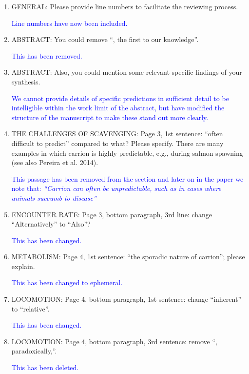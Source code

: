 \documentclass[12pt,letterpaper]{article}
\begin{document}
\begin{enumerate}

\item{GENERAL:} Please provide line numbers to facilitate the reviewing process.

\textcolor{blue}{Line numbers have now been included. }

\item{ABSTRACT:} You could remove ``, the first to our knowledge''.

\textcolor{blue}{This has been removed.}

\item{ABSTRACT:} Also, you could mention some relevant specific findings of your synthesis.

\textcolor{blue}{We cannot provide details of specific predictions in sufficient detail to be intelligible within the work limit of the abstract, but have modified the structure of the manuscript to make these stand out more clearly.} 


\item{THE CHALLENGES OF SCAVENGING:} Page 3, 1st sentence: ``often difficult to predict'' compared to what? Please specify. There are many examples in which carrion is highly predictable, e.g., during salmon spawning (see also Pereira et al. 2014).

\textcolor{blue}{This passage has been removed from the section and later on in the paper we note that: \textit{``Carrion can often be unpredictable, such as in cases where animals succumb to disease''}}

\item{ENCOUNTER RATE:} Page 3, bottom paragraph, 3rd line: change ``Alternatively'' to ``Also''?

\textcolor{blue}{This has been changed.}

\item{METABOLISM:} Page 4, 1st sentence: ``the sporadic nature of carrion''; please explain.

\textcolor{blue}{This has been changed to ephemeral.}

\item{LOCOMOTION:} Page 4, bottom paragraph, 1st sentence: change ``inherent'' to ``relative''.

\textcolor{blue}{This has been changed.}

\item{LOCOMOTION:} Page 4, bottom paragraph, 3rd sentence: remove ``, paradoxically,''.

\textcolor{blue}{This has been deleted.}


\end{enumerate}
\end{document}
